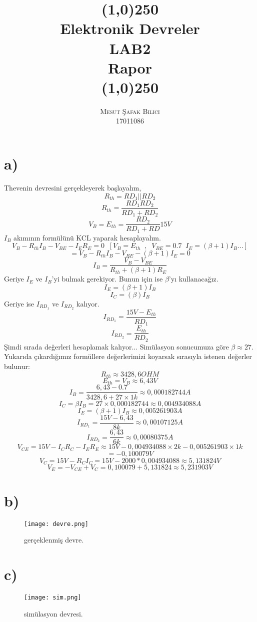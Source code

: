 \documentclass[11pt]{article}
\date{}
\begin{document}
\title{\line(1,0){250} \\ \huge{\textbf{Elektronik Devreler  \\ LAB2 \\Rapor}} \\\line(1,0){250}}
\author{\textsc{Mesut Şafak Bilici} \\ 17011086}
\maketitle
\section{a) }
Thevenin devresini gerçekleyerek başlayalım,
$$R_{th} = RD_1 || RD_2$$
$$R_{th} = \frac{RD_1 RD_2}{RD_1 + RD_2}$$
$$V_B = E_{th} = \frac{RD_2}{RD_1 + RD} 15V$$
$I_B$ akımının formülünü KCL yaparak hesaplayalım.
$$V_B - R_{th} I_B - V_{BE} - I_ER_E = 0 \;\;[V_B = E_{th}\;\; , \;\;V_{BE} = 0.7 \;\; I_E=(\beta + 1)I_B ... ]$$
$$=V_B - R_{th} I_B -V_{BE} - (\beta + 1)I_E = 0$$
$$I_B = \frac{V_B - V_{BE}}{R_{th} + (\beta + 1)R_E}$$
Geriye $I_E$ ve $I_B$'yi bulmak gerekiyor. Bunun için ise $\beta$'yı kullanacağız.
$$ I_E = (\beta + 1) I_B$$
$$ I_C = (\beta) I_B$$
Geriye ise $I_{RD_1}$ ve $I_{RD_2}$ kalıyor.
$$I_{RD_1}=\frac{15V -E_{th}}{RD_1}$$
$$I_{RD_2}=\frac{E_{th}}{RD_2}$$
Şimdi sırada değerleri hesaplamak kalıyor... Simülasyon sonucumuza göre $\beta \approx27$. Yukarıda çıkardığımız formüllere değerlerimizi koyarsak sırasıyla istenen değerler bulunur:
$$R_{th} \approx 3428,6OHM$$
$$E_{th} = V_B \approx 6,43V$$
$$I_B = \frac{6,43 - 0.7}{ 3428,6 + 27 \times 1k} \approx 0,000182744A$$
$$I_C = \beta I_B = 27 \times 0,000182744 \approx 0,004934088A$$
$$I_E = (\beta + 1) I_B \approx 0,005261903A$$
$$I_{RD_1}=\frac{15V -6,43}{8k} \approx 0,00107125A$$
$$I_{RD_2}=\frac{6,43}{6k} \approx 0,00080375A$$
$$V_{CE} = 15V- I_CR_C - I_ER_E \approx 15V - 0,004934088 \times 2k - 0,005261903 \times 1k$$
$$=-0,100079V$$
$$V_C=15V-R_CI_C = 15V - 2000 *  0,004934088 \approx 5,131824V$$
$$V_E = - V_{CE} + V_{C} = 0,100079 + 5,131824 \approx 5,231903V$$
\section{b) }
\begin{figure}[H]
\centering
\texttt{[image: devre.png]}
\caption{gerçeklenmiş devre.}
\label{fig:figure3}
\end{figure}
\pagebreak
\section{c) }
\begin{figure}[H]
\centering
\texttt{[image: sim.png]}
\caption{simülasyon devresi.}
\label{fig:figure3}
\end{figure}
\end{document}
